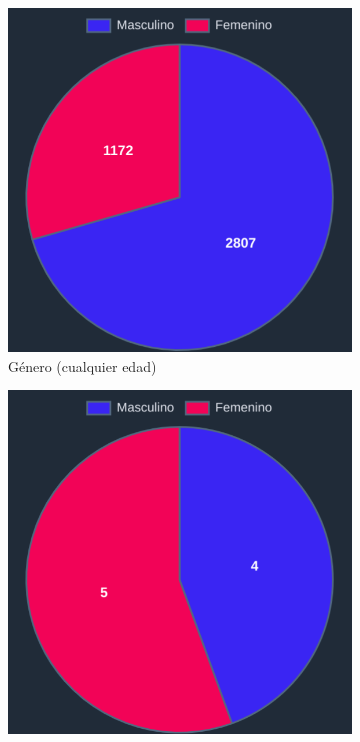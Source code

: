 \begin{figure}[H]
  \centering
  \begin{subfigure}{0.3\textwidth}
   \includegraphics[width=\textwidth]{imaxes/capturas-app/graficos/modaresi/grafico-genero.png}
  \caption{Género (cualquier edad)}
  \label{subfig:blm/resultados-genero-moda}
  \end{subfigure}
  \begin{subfigure}{0.3\textwidth}
   \includegraphics[width=\textwidth]{imaxes/capturas-app/graficos/modaresi/grafico-genero-jj.png}

\end{subfigure}
\end{figure}

